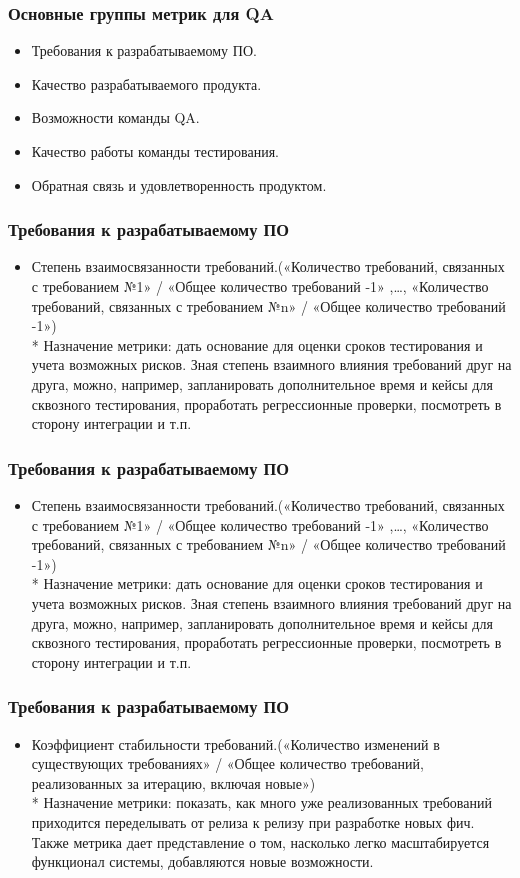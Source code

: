 \documentclass{../industrial-development}
\begin{document}
	\begin{frame} \frametitle{Основные группы метрик для QA}
		\begin{itemize}
			\item Требования к разрабатываемому ПО.
			\item Качество разрабатываемого продукта.
			\item Возможности команды QA.
			\item Качество работы команды тестирования.
			\item Обратная связь и удовлетворенность продуктом.
		\end{itemize}
	\end{frame}
	\begin{frame} \frametitle{Требования к разрабатываемому ПО}
		\begin{itemize}
			\item Степень взаимосвязанности требований.(«Количество требований, связанных с требованием №1» / «Общее количество требований -1» ,…, «Количество требований, связанных с требованием №n» / «Общее количество требований -1»)
			\\* Назначение метрики: дать основание для оценки сроков тестирования и учета возможных рисков. Зная степень взаимного влияния требований друг на друга, можно, например, запланировать дополнительное время и кейсы для сквозного тестирования, проработать регрессионные проверки, посмотреть в сторону интеграции и т.п. 
		\end{itemize}
	\end{frame}
\begin{frame} \frametitle{Требования к разрабатываемому ПО}
	\begin{itemize}  
		\item Степень взаимосвязанности требований.(«Количество требований, связанных с требованием №1» / «Общее количество требований -1» ,…, «Количество требований, связанных с требованием №n» / «Общее количество требований -1»)
		\\* Назначение метрики: дать основание для оценки сроков тестирования и учета возможных рисков. Зная степень взаимного влияния требований друг на друга, можно, например, запланировать дополнительное время и кейсы для сквозного тестирования, проработать регрессионные проверки, посмотреть в сторону интеграции и т.п. 
	\end{itemize}
\end{frame}

		\begin{frame} \frametitle{Требования к разрабатываемому ПО}
		\begin{itemize} 
			\item Коэффициент стабильности требований.(«Количество изменений в существующих требованиях» / «Общее количество требований, реализованных за итерацию, включая новые»)
			\\* Назначение метрики: показать, как много уже реализованных требований приходится переделывать от релиза к релизу при разработке новых фич. Также метрика дает представление о том, насколько легко масштабируется функционал системы, добавляются новые возможности.
		\end{itemize}
	\end{frame}
\end{document}

